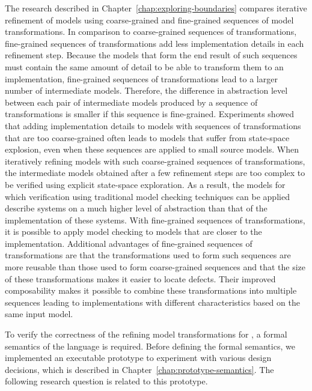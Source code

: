 \RQTwo

\noindent
The research described in Chapter~\ref{chap:exploring-boundaries} compares iterative refinement of models using coarse-grained and fine-grained sequences of model transformations.
In comparison to coarse-grained sequences of transformations, fine-grained sequences of transformations add less implementation details in each refinement step.
Because the models that form the end result of such sequences must contain the same amount of detail to be able to transform them to an implementation, fine-grained sequences of transformations lead to a larger number of intermediate models.
Therefore, the difference in abstraction level between each pair of intermediate models produced by a sequence of transformations is smaller if this sequence is fine-grained.
Experiments showed that adding implementation details to models with sequences of transformations that are too coarse-grained often leads to models that suffer from state-space explosion, even when these sequences are applied to small source models.
When iteratively refining models with such coarse-grained sequences of transformations, the intermediate models obtained after a few refinement steps are too complex to be verified using explicit state-space exploration.
As a result, the models for which verification using traditional model checking techniques can be applied describe systems on a much higher level of abstraction than that of the implementation of these systems.
With fine-grained sequences of transformations, it is possible to apply model checking to models that are closer to the implementation.
Additional advantages of fine-grained sequences of transformations are that the transformations used to form such sequences are more reusable than those used to form coarse-grained sequences and that the size of these transformations makes it easier to locate defects.
Their improved composability makes it possible to combine these transformations into multiple sequences leading to implementations with different characteristics based on the same input model.


To verify the correctness of the refining model transformations for \SLCO, a formal semantics of the language is required.
Before defining the formal semantics, we implemented an executable prototype to experiment with various design decisions, which is described in Chapter~\ref{chap:prototype-semantics}.
The following research question is related to this prototype.

